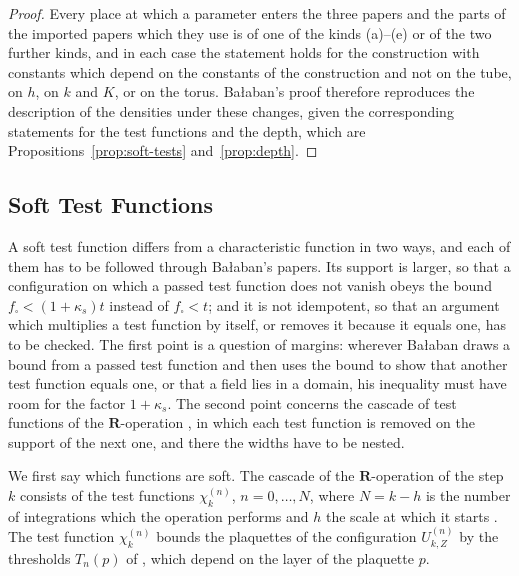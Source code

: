 \documentclass[11pt]{preprint}
\numberwithin{equation}{section}
\theoremstyle{definition}
\theoremstyle{remark}
\theoremstyle{plain}
\begin{document}
\begin{proof}
Every place at which a parameter enters the three papers and the parts of the imported papers which they use is of one of the kinds (a)--(e) or of the two further kinds, and in each case the statement holds for the construction with constants which depend on the constants of the construction and not on the tube, on $h$, on $k$ and $K$, or on the torus. Ba{\l}aban's proof therefore reproduces the description of the densities under these changes, given the corresponding statements for the test functions and the depth, which are Propositions~\ref{prop:soft-tests} and~\ref{prop:depth}.
\end{proof}

\subsection{Soft Test Functions}\label{sec:soft-tests}

A soft test function differs from a characteristic function in two ways, and each of them has to be followed through Ba{\l}aban's papers. Its support is larger, so that a configuration on which a passed test function does not vanish obeys the bound $f_\square < (1 + \kappa_s)t$ instead of $f_\square < t$; and it is not idempotent, so that an argument which multiplies a test function by itself, or removes it because it equals one, has to be checked. The first point is a question of margins: wherever Ba{\l}aban draws a bound from a passed test function and then uses the bound to show that another test function equals one, or that a field lies in a domain, his inequality must have room for the factor $1 + \kappa_s$. The second point concerns the cascade of test functions of the $\mathbf R$-operation \cite[(1.22)--(1.24), p.~181]{BalabanLFR1}, in which each test function is removed on the support of the next one, and there the widths have to be nested.

We first say which functions are soft. The cascade of the $\mathbf R$-operation of the step $k$ consists of the test functions $\chi_k^{(n)}$, $n = 0, \dots, N$, where $N = k - h$ is the number of integrations which the operation performs and $h$ the scale at which it starts \cite[pp.~181--182]{BalabanLFR1}. The test function $\chi_k^{(n)}$ bounds the plaquettes of the configuration $U^{(n)}_{k,Z}$ by the thresholds $T_n(p)$ of \cite[(1.24), p.~182]{BalabanLFR1}, which depend on the layer of the plaquette $p$.
\end{document}
